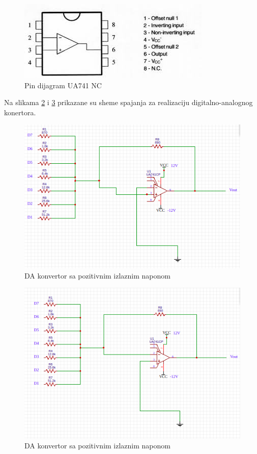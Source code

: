 \documentclass[12pt]{article}
\begin{document}
\begin{figure}[h!]
    \centering
  \includegraphics[scale=0.7]{pindijagram.jpeg}
  \caption{Pin dijagram UA741 NC}
  \label{fig:pinD}
\end{figure}

Na slikama \ref{fig:poz} i \ref{fig:neg} prikazane su sheme spajanja za realizaciju digitalno-analognog konertora.

\begin{figure}[h!]
    \centering
  \includegraphics[scale=0.7]{DACpozitv.png}
  \caption{DA konvertor sa pozitivnim izlaznim naponom}
  \label{fig:poz}
\end{figure}

\begin{figure}[h!]
    \centering
  \includegraphics[scale=0.7]{DACnegat.png}
  \caption{DA konvertor sa pozitivnim izlaznim naponom}
  \label{fig:neg}
\end{figure}
\end{document}
